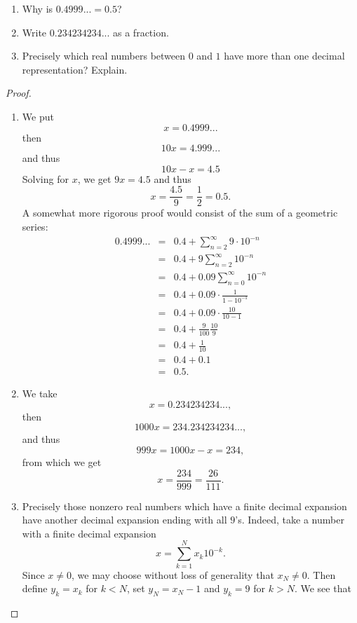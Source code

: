 \begin{exercise}{16}
\begin{enumerate}
    \item Why is $0.4999... = 0.5$?
    \item Write $0.234234234...$ as a fraction.
    \item Precisely which real numbers between $0$ and $1$ have more than one decimal representation? Explain.
\end{enumerate}
\end{exercise}
\begin{proof}
    \begin{enumerate}
        \item We put
        $$x = 0.4999...$$
        then
        $$10x = 4.999...$$
        and thus
        $$10x - x = 4.5$$
        Solving for $x$, we get $9x = 4.5$ and thus
        $$x = \frac{4.5}{9} = \frac{1}{2} = 0.5.$$
        A somewhat more rigorous proof would consist of the sum of a geometric series:
        \begin{eqnarray*}
            0.4999...
            & = & 0.4 + \sum_{n=2}^\infty 9\cdot 10^{-n}\\
            & = & 0.4 + 9\sum_{n=2}^\infty 10^{-n}\\
            & = & 0.4 + 0.09 \sum_{n=0}^\infty 10^{-n}\\
            & = & 0.4 + 0.09\cdot \frac{1}{1 - 10^{-1}}\\
            & = & 0.4 + 0.09\cdot \frac{10}{10 - 1}\\
            & = & 0.4 + \frac{9}{100}\frac{10}{9}\\
            & = & 0.4 + \frac{1}{10}\\
            & = & 0.4 + 0.1\\
            & = & 0.5.
        \end{eqnarray*}
        \item We take
        $$x = 0.234234234...,$$
        then
        $$1000x = 234.234234234...,$$
        and thus
        $$999x = 1000x-x = 234,$$
        from which we get
        $$x = \frac{234}{999} = \frac{26}{111}.$$
        \item Precisely those nonzero real numbers which have a finite decimal expansion have another decimal expansion ending with all $9$'s. Indeed, take a number with a finite decimal expansion
        $$x = \sum_{k=1}^N x_k 10^{-k}.$$
        Since $x\neq 0$, we may choose without loss of generality that $x_N\neq 0$. Then define $y_k = x_k$ for $k<N$, set $y_N = x_N - 1$ and $y_k = 9$ for $k>N$. We see that

\end{enumerate}
\end{proof}
